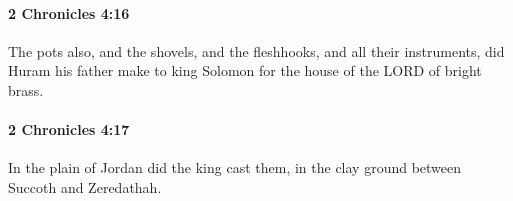 		\paragraph{2 Chronicles 4:16} %
			\label{2CHRONICLES-4-16}

			The pots also, and the shovels, and the fleshhooks, and all their instruments, did Huram his father make to king Solomon for the house of the LORD of bright brass.


		\paragraph{2 Chronicles 4:17} %
			\label{2CHRONICLES-4-17}

			In the plain of Jordan did the king cast them, in the clay ground between Succoth and Zeredathah.


